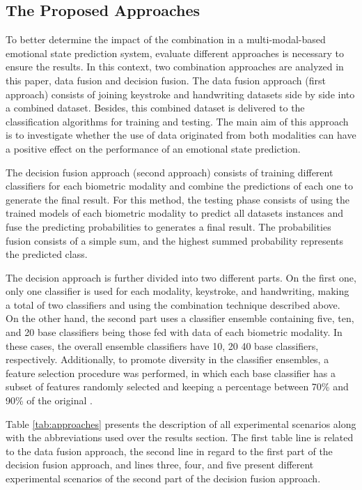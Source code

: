 \documentclass[conference]{IEEEtran}
\begin{document}
\subsection{The Proposed Approaches}

To better determine the impact of the combination in a multi-modal-based emotional state prediction system, evaluate different approaches is necessary to ensure the results. In this context, two combination approaches are analyzed in this paper, data fusion and decision fusion. 
The data fusion approach (first approach) consists of joining keystroke and handwriting datasets side by side into a combined dataset. Besides, this combined dataset is delivered to the classification algorithms for training and testing. The main aim of this approach is to investigate whether the use of data originated from both modalities can have a positive effect on the performance of an emotional state prediction. 

The decision fusion approach (second approach) consists of training different classifiers for each biometric modality and combine the predictions of each one to generate the final result. 
For this method, the testing phase consists of using the trained models of each biometric modality to predict all datasets instances and fuse the predicting probabilities to generates a final result. The probabilities fusion consists of a simple sum, and the highest summed probability represents the predicted class.

The decision approach is further divided into two different parts. On the first one, only one classifier is used for each modality, keystroke, and handwriting, making a total of two classifiers and using the combination technique described above. 
On the other hand, the second part uses a classifier ensemble containing five, ten, and 20 base classifiers being those fed with data of each biometric modality. In these cases, the overall ensemble classifiers have 10, 20 40 base classifiers, respectively. Additionally, to promote diversity in the classifier ensembles, a feature selection procedure was performed, in which each base classifier has a subset of features randomly selected and keeping a percentage between 70\% and 90\% of the original \cite{dietterich-ensemble}. 

Table \ref{tab:approaches} presents the description of all experimental scenarios along with the abbreviations used over the results section. The first table line is related to the data fusion approach, the second line in regard to the first part of the decision fusion approach, and lines three, four, and five present different experimental scenarios of the second part of the decision fusion approach.
\end{document}
